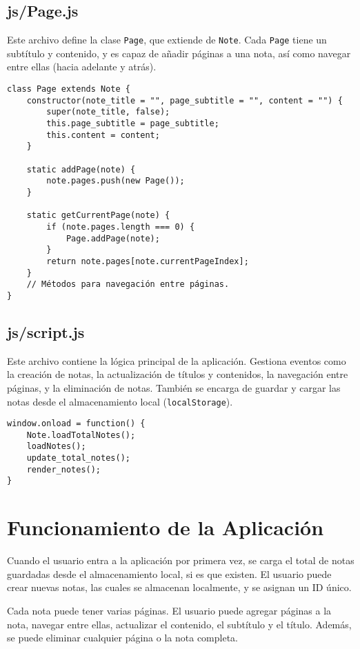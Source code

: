 \documentclass[a4paper,12pt]{report}
\begin{document}
\section{js/Page.js}

Este archivo define la clase \texttt{Page}, que extiende de \texttt{Note}. Cada \texttt{Page} tiene un subtítulo y contenido, y es capaz de añadir páginas a una nota, así como navegar entre ellas (hacia adelante y atrás).

\begin{verbatim}
class Page extends Note {
	constructor(note_title = "", page_subtitle = "", content = "") {
		super(note_title, false);
		this.page_subtitle = page_subtitle;
		this.content = content;
	}

	static addPage(note) {
		note.pages.push(new Page());
	}

	static getCurrentPage(note) {
		if (note.pages.length === 0) {
			Page.addPage(note);
		}
		return note.pages[note.currentPageIndex];
	}
	// Métodos para navegación entre páginas.
}
\end{verbatim}

\section{js/script.js}

Este archivo contiene la lógica principal de la aplicación. Gestiona eventos como la creación de notas, la actualización de títulos y contenidos, la navegación entre páginas, y la eliminación de notas. También se encarga de guardar y cargar las notas desde el almacenamiento local (\texttt{localStorage}).

\begin{verbatim}
window.onload = function() {
	Note.loadTotalNotes();
	loadNotes();
	update_total_notes();
	render_notes();
}
\end{verbatim}

\chapter{Funcionamiento de la Aplicación}

Cuando el usuario entra a la aplicación por primera vez, se carga el total de notas guardadas desde el almacenamiento local, si es que existen. El usuario puede crear nuevas notas, las cuales se almacenan localmente, y se asignan un ID único.

Cada nota puede tener varias páginas. El usuario puede agregar páginas a la nota, navegar entre ellas, actualizar el contenido, el subtítulo y el título. Además, se puede eliminar cualquier página o la nota completa.
\end{document}

